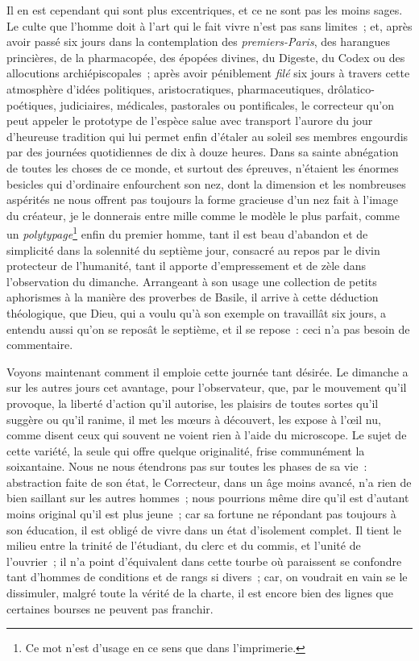 \documentclass[french,twoside]{book} %
\begin{document}
Il en est cependant qui sont plus excentriques, et ce ne sont pas les moins sages. Le culte que l’homme doit à l’art qui le fait  vivre n’est pas sans limites ; et, après avoir passé six jours dans la contemplation des \emph{premiers-Paris}, des harangues princières, de la pharmacopée, des épopées divines, du Digeste, du Codex ou des allocutions archiépiscopales ; après avoir péniblement \emph{filé} six jours à travers cette atmosphère d’idées politiques, aristocratiques, pharmaceutiques, drôlatico-poétiques, judiciaires, médicales, pastorales ou pontificales, le correcteur qu’on peut appeler le prototype de l’espèce salue avec transport l’aurore du jour d’heureuse tradition qui lui permet enfin d’étaler au soleil ses membres engourdis par des journées quotidiennes de dix à douze heures. Dans sa sainte abnégation de toutes les choses de ce monde, et surtout des épreuves, n’étaient les énormes besicles qui d’ordinaire enfourchent son nez, dont la dimension et les nombreuses aspérités ne nous offrent pas toujours la forme gracieuse  d’un nez fait à l’image du créateur, je le donnerais entre mille comme le modèle le plus parfait, comme un \emph{polytypage}\footnote{ \noindent Ce mot n’est d’usage en ce sens que dans l’imprimerie.
 } enfin du premier homme, tant il est beau d’abandon et de simplicité dans la solennité du septième jour, consacré au repos par le divin protecteur de l’humanité, tant il apporte d’empressement et de zèle dans l’observation du dimanche. Arrangeant à son usage une collection de petits aphorismes à la manière des proverbes de Basile, il arrive à cette déduction théologique, que Dieu, qui a voulu qu’à son exemple on travaillât six jours, a entendu aussi qu’on se reposât le septième, et il se repose : ceci n’a pas besoin de commentaire.\par
Voyons maintenant comment il emploie cette journée tant désirée. Le dimanche a sur les autres jours cet avantage, pour l’observateur,  que, par le mouvement qu’il provoque, la liberté d’action qu’il autorise, les plaisirs de toutes sortes qu’il suggère ou qu’il ranime, il met les mœurs à découvert, les expose à l’œil nu, comme disent ceux qui souvent ne voient rien à l’aide du microscope. Le sujet de cette variété, la seule qui offre quelque originalité, frise communément la soixantaine. Nous ne nous étendrons pas sur toutes les phases de sa vie : abstraction faite de son état, le Correcteur, dans un âge moins avancé, n’a rien de bien saillant sur les autres hommes ; nous pourrions même dire qu’il est d’autant moins original qu’il est plus jeune ; car sa fortune ne répondant pas toujours à son éducation, il est obligé de vivre dans un état d’isolement complet. Il tient le milieu entre la trinité de l’étudiant, du clerc et du commis, et l’unité de l’ouvrier ; il n’a point d’équivalent dans cette tourbe où paraissent se  confondre tant d’hommes de conditions et de rangs si divers ; car, on voudrait en vain se le dissimuler, malgré toute la vérité de la charte, il est encore bien des lignes que certaines bourses ne peuvent pas franchir.\par
\end{document}
